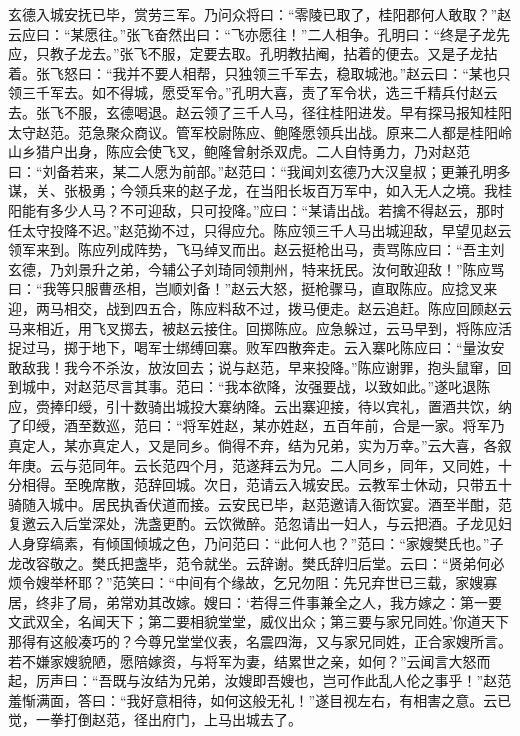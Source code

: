 玄德入城安抚已毕，赏劳三军。乃问众将曰：“零陵已取了，桂阳郡何人敢取？”赵云应曰：“某愿往。”张飞奋然出曰：“飞亦愿往！”二人相争。孔明曰：“终是子龙先应，只教子龙去。”张飞不服，定要去取。孔明教拈阉，拈着的便去。又是子龙拈着。张飞怒曰：“我并不要人相帮，只独领三千军去，稳取城池。”赵云曰：“某也只领三千军去。如不得城，愿受军令。”孔明大喜，责了军令状，选三千精兵付赵云去。张飞不服，玄德喝退。赵云领了三千人马，径往桂阳进发。早有探马报知桂阳太守赵范。范急聚众商议。管军校尉陈应、鲍隆愿领兵出战。原来二人都是桂阳岭山乡猎户出身，陈应会使飞叉，鲍隆曾射杀双虎。二人自恃勇力，乃对赵范曰：“刘备若来，某二人愿为前部。”赵范曰：“我闻刘玄德乃大汉皇叔；更兼孔明多谋，关、张极勇；今领兵来的赵子龙，在当阳长坂百万军中，如入无人之境。我桂阳能有多少人马？不可迎敌，只可投降。”应曰：“某请出战。若擒不得赵云，那时任太守投降不迟。”赵范拗不过，只得应允。陈应领三千人马出城迎敌，早望见赵云领军来到。陈应列成阵势，飞马绰叉而出。赵云挺枪出马，责骂陈应曰：“吾主刘玄德，乃刘景升之弟，今辅公子刘琦同领荆州，特来抚民。汝何敢迎敌！”陈应骂曰：“我等只服曹丞相，岂顺刘备！”赵云大怒，挺枪骤马，直取陈应。应捻叉来迎，两马相交，战到四五合，陈应料敌不过，拨马便走。赵云追赶。陈应回顾赵云马来相近，用飞叉掷去，被赵云接住。回掷陈应。应急躲过，云马早到，将陈应活捉过马，掷于地下，喝军士绑缚回寨。败军四散奔走。云入寨叱陈应曰：“量汝安敢敌我！我今不杀汝，放汝回去；说与赵范，早来投降。”陈应谢罪，抱头鼠窜，回到城中，对赵范尽言其事。范曰：“我本欲降，汝强要战，以致如此。”遂叱退陈应，赍捧印绶，引十数骑出城投大寨纳降。云出寨迎接，待以宾礼，置酒共饮，纳了印绶，酒至数巡，范曰：“将军姓赵，某亦姓赵，五百年前，合是一家。将军乃真定人，某亦真定人，又是同乡。倘得不弃，结为兄弟，实为万幸。”云大喜，各叙年庚。云与范同年。云长范四个月，范遂拜云为兄。二人同乡，同年，又同姓，十分相得。至晚席散，范辞回城。次日，范请云入城安民。云教军士休动，只带五十骑随入城中。居民执香伏道而接。云安民已毕，赵范邀请入衙饮宴。酒至半酣，范复邀云入后堂深处，洗盏更酌。云饮微醉。范忽请出一妇人，与云把酒。子龙见妇人身穿缟素，有倾国倾城之色，乃问范曰：“此何人也？”范曰：“家嫂樊氏也。”子龙改容敬之。樊氏把盏毕，范令就坐。云辞谢。樊氏辞归后堂。云曰：“贤弟何必烦令嫂举杯耶？”范笑曰：“中间有个缘故，乞兄勿阻：先兄弃世已三载，家嫂寡居，终非了局，弟常劝其改嫁。嫂曰：‘若得三件事兼全之人，我方嫁之：第一要文武双全，名闻天下；第二要相貌堂堂，威仪出众；第三要与家兄同姓。’你道天下那得有这般凑巧的？今尊兄堂堂仪表，名震四海，又与家兄同姓，正合家嫂所言。若不嫌家嫂貌陋，愿陪嫁资，与将军为妻，结累世之亲，如何？”云闻言大怒而起，厉声曰：“吾既与汝结为兄弟，汝嫂即吾嫂也，岂可作此乱人伦之事乎！”赵范羞惭满面，答曰：“我好意相待，如何这般无礼！”遂目视左右，有相害之意。云已觉，一拳打倒赵范，径出府门，上马出城去了。


